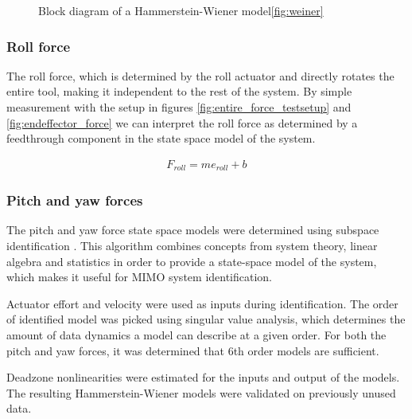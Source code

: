 \begin{figure} 
\caption{Block diagram of a Hammerstein-Wiener model\ref{fig:weiner}}
\label{weiner}
\end{figure}

\subsubsection{Roll force}
The roll force, which is determined by the roll actuator and directly rotates the entire tool, making it independent to the rest of the system.
By simple measurement with the setup in figures \ref{fig:entire_force_testsetup} and \ref{fig:endeffector_force} we can interpret the roll force as determined by a feedthrough component in the state space model of the system.

\begin{align}
F_{roll} = m e_{roll} + b
\end{align}

\subsubsection{Pitch and yaw forces}
The pitch and yaw force state space models were determined using subspace identification  \cite{van2012subspace}. This algorithm combines concepts from system theory, linear algebra and statistics in order to provide a state-space model of the system, which makes it useful for MIMO system identification. 

Actuator effort and velocity were used as inputs during identification.
The order of identified model was picked using singular value analysis, which determines the amount of data dynamics a model can describe at a given order. For both the pitch and yaw forces, it was determined that 6th order models are sufficient. 

Deadzone nonlinearities were estimated for the inputs and output of the models. The resulting Hammerstein-Wiener models were validated on previously unused data.





